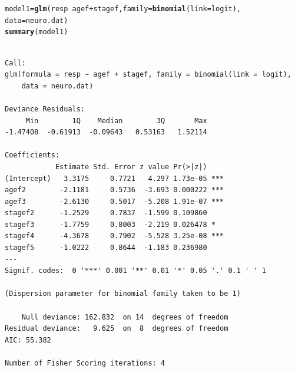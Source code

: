 \documentclass[oneside]{book}\usepackage[]{graphicx}\usepackage[svgnames]{xcolor}
\makeatletter
\newcommand{\hlopt}[1]{\textcolor[rgb]{0,0,0}{#1}}%
\newcommand{\hlstd}[1]{\textcolor[rgb]{0.345,0.345,0.345}{#1}}%
\newcommand{\hlkwb}[1]{\textcolor[rgb]{0.69,0.353,0.396}{#1}}%
\newcommand{\hlkwc}[1]{\textcolor[rgb]{0.333,0.667,0.333}{#1}}%
\newcommand{\hlkwd}[1]{\textcolor[rgb]{0.737,0.353,0.396}{\textbf{#1}}}%
\newenvironment{kframe}{%
 \def\at@end@of@kframe{}%
 \ifinner\ifhmode%
  \def\at@end@of@kframe{\end{minipage}}%
  \begin{minipage}{\columnwidth}%
 \fi\fi%
 \def\FrameCommand##1{\hskip\@totalleftmargin \hskip-\fboxsep
 \colorbox{shadecolor}{##1}\hskip-\fboxsep
     \hskip-\linewidth \hskip-\@totalleftmargin \hskip\columnwidth}%
 \MakeFramed {\advance\hsize-\width
   \@totalleftmargin\z@ \linewidth\hsize
   \@setminipage}}%
 {\par\unskip\endMakeFramed%
 \at@end@of@kframe}
\newenvironment{knitrout}{}{} %
\makeatother
\begin{document}
\begin{knitrout}
\color{fgcolor}\begin{kframe}
\begin{alltt}
\hlstd{model1} \hlkwb{=} \hlkwd{glm}\hlstd{(resp} \hlopt{~} \hlstd{agef} \hlopt{+} \hlstd{stagef,} \hlkwc{family} \hlstd{=} \hlkwd{binomial}\hlstd{(}\hlkwc{link} \hlstd{= logit),}
  \hlkwc{data} \hlstd{= neuro.dat)}
\hlkwd{summary}\hlstd{(model1)}
\end{alltt}
\begin{verbatim}

Call:
glm(formula = resp ~ agef + stagef, family = binomial(link = logit), 
    data = neuro.dat)

Deviance Residuals: 
     Min        1Q    Median        3Q       Max  
-1.47408  -0.61913  -0.09643   0.53163   1.52114  

Coefficients:
            Estimate Std. Error z value Pr(>|z|)    
(Intercept)   3.3175     0.7721   4.297 1.73e-05 ***
agef2        -2.1181     0.5736  -3.693 0.000222 ***
agef3        -2.6130     0.5017  -5.208 1.91e-07 ***
stagef2      -1.2529     0.7837  -1.599 0.109860    
stagef3      -1.7759     0.8003  -2.219 0.026478 *  
stagef4      -4.3678     0.7902  -5.528 3.25e-08 ***
stagef5      -1.0222     0.8644  -1.183 0.236980    
---
Signif. codes:  0 '***' 0.001 '**' 0.01 '*' 0.05 '.' 0.1 ' ' 1

(Dispersion parameter for binomial family taken to be 1)

    Null deviance: 162.832  on 14  degrees of freedom
Residual deviance:   9.625  on  8  degrees of freedom
AIC: 55.382

Number of Fisher Scoring iterations: 4
\end{verbatim}
\end{kframe}
\end{knitrout}
\end{document}
